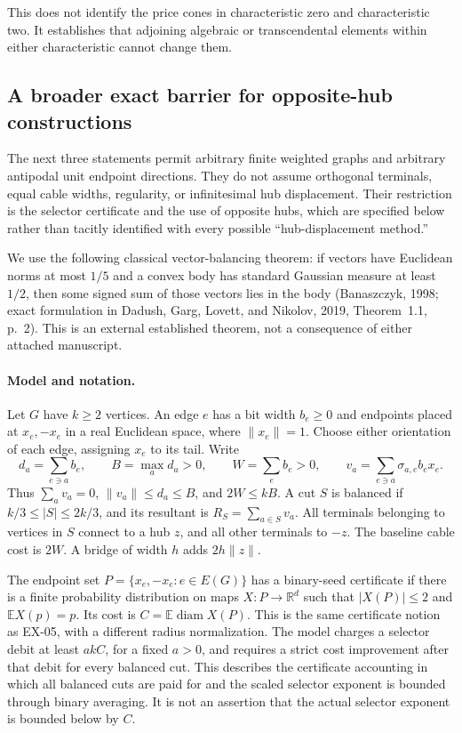 This does not identify the price cones in characteristic zero and
characteristic two.  It establishes that adjoining algebraic or
transcendental elements within either characteristic cannot change them.

\subsection{A broader exact barrier for opposite-hub constructions}
\label{sec:ex-broad-barrier}

The next three statements permit arbitrary finite weighted graphs and arbitrary
antipodal unit endpoint directions.  They do not assume orthogonal terminals,
equal cable widths, regularity, or infinitesimal hub displacement.  Their
restriction is the selector certificate and the use of opposite hubs, which
are specified below rather than tacitly identified with every possible
``hub-displacement method.''

We use the following classical vector-balancing theorem: if vectors have
Euclidean norms at most $1/5$ and a convex body has standard Gaussian measure
at least $1/2$, then some signed sum of those vectors lies in the body
(Banaszczyk, 1998; exact formulation in Dadush, Garg, Lovett, and Nikolov,
2019, Theorem~1.1, p.~2).  This is an external established theorem, not a
consequence of either attached manuscript.

\paragraph{Model and notation.}
Let $G$ have $k\geq2$ vertices.  An edge $e$ has a bit width $b_e\geq0$ and
endpoints placed at $x_e,-x_e$ in a real Euclidean space, where $\|x_e\|=1$.
Choose either orientation of each edge, assigning $x_e$ to its tail.  Write
\[
 d_a=\sum_{e\ni a}b_e,\qquad
 B=\max_a d_a>0,\qquad W=\sum_e b_e>0,
 \qquad v_a=\sum_{e\ni a}\sigma_{a,e}b_e x_e.
\]
Thus $\sum_a v_a=0$, $\|v_a\|\leq d_a\leq B$, and $2W\leq kB$.
A cut $S$ is balanced if $k/3\leq|S|\leq2k/3$, and its resultant is
$R_S=\sum_{a\in S}v_a$.  All terminals belonging to vertices in $S$ connect
to a hub $z$, and all other terminals to $-z$.  The baseline cable cost is
$2W$.  A bridge of width $h$ adds $2h\|z\|$.

The endpoint set $P=\{x_e,-x_e:e\in E(G)\}$ has a binary-seed certificate
if there is a finite probability distribution on maps $X:P\to\mathbb R^d$
such that $|X(P)|\leq2$ and $\mathbb EX(p)=p$.  Its cost is
$C=\mathbb E\operatorname{diam}X(P)$.  This is the same certificate notion
as EX-05, with a different radius normalization.  The model charges a selector
debit at least $akC$, for a fixed $a>0$, and requires a strict cost improvement
after that debit for every balanced cut.  This describes the certificate
accounting in which all balanced cuts are paid for and the scaled selector
exponent is bounded through binary averaging.  It is not an assertion that
the actual selector exponent is bounded below by $C$.

